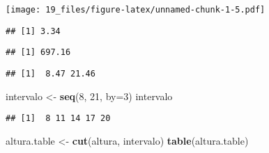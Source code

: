 \documentclass[
]{article}
\newenvironment{Shaded}{\begin{snugshade}}{\end{snugshade}}
\newcommand{\CommentTok}[1]{\textcolor[rgb]{0.56,0.35,0.01}{\textit{#1}}}
\newcommand{\DataTypeTok}[1]{\textcolor[rgb]{0.13,0.29,0.53}{#1}}
\newcommand{\DecValTok}[1]{\textcolor[rgb]{0.00,0.00,0.81}{#1}}
\newcommand{\KeywordTok}[1]{\textcolor[rgb]{0.13,0.29,0.53}{\textbf{#1}}}
\newcommand{\NormalTok}[1]{#1}
\newcommand{\OperatorTok}[1]{\textcolor[rgb]{0.81,0.36,0.00}{\textbf{#1}}}
\newcommand{\StringTok}[1]{\textcolor[rgb]{0.31,0.60,0.02}{#1}}
\begin{document}
\texttt{[image: 19\_files/figure-latex/unnamed-chunk-1-5.pdf]}

\begin{Shaded}
\end{Shaded}

\begin{verbatim}
## [1] 3.34
\end{verbatim}

\begin{Shaded}
\end{Shaded}

\begin{verbatim}
## [1] 697.16
\end{verbatim}

\begin{Shaded}
\end{Shaded}

\begin{verbatim}
## [1]  8.47 21.46
\end{verbatim}

\begin{Shaded}
\begin{Highlighting}[]
\NormalTok{intervalo <-}\StringTok{ }\KeywordTok{seq}\NormalTok{(}\DecValTok{8}\NormalTok{, }\DecValTok{21}\NormalTok{, }\DataTypeTok{by=}\DecValTok{3}\NormalTok{)}
\NormalTok{intervalo}
\end{Highlighting}
\end{Shaded}

\begin{verbatim}
## [1]  8 11 14 17 20
\end{verbatim}

\begin{Shaded}
\begin{Highlighting}[]
\NormalTok{altura.table <-}\StringTok{ }\KeywordTok{cut}\NormalTok{(altura, intervalo)}
\KeywordTok{table}\NormalTok{(altura.table)}
\end{Highlighting}
\end{Shaded}
\end{document}
